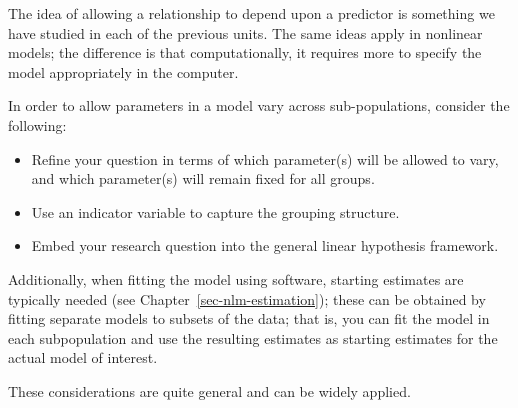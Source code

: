 \documentclass[
  letterpaper,
  DIV=11,
  numbers=noendperiod]{scrreprt}
\providecommand{\tightlist}{%
  \setlength{\itemsep}{0pt}\setlength{\parskip}{0pt}}\usepackage{longtable,booktabs,array}
\theoremstyle{definition}
\theoremstyle{definition}
\theoremstyle{remark}
\begin{document}
The idea of allowing a relationship to depend upon a predictor is
something we have studied in each of the previous units. The same ideas
apply in nonlinear models; the difference is that computationally, it
requires more to specify the model appropriately in the computer.

\begin{tcolorbox}[enhanced jigsaw, left=2mm, toprule=.15mm, arc=.35mm, breakable, opacitybacktitle=0.6, opacityback=0, rightrule=.15mm, colbacktitle=quarto-callout-note-color!10!white, coltitle=black, leftrule=.75mm, toptitle=1mm, colframe=quarto-callout-note-color-frame, titlerule=0mm, title=\textcolor{quarto-callout-note-color}{\faInfo}\hspace{0.5em}{General Approach for Including Interactions}, bottomrule=.15mm, colback=white, bottomtitle=1mm]

In order to allow parameters in a model vary across sub-populations,
consider the following:

\begin{itemize}
\tightlist
\item
  Refine your question in terms of which parameter(s) will be allowed to
  vary, and which parameter(s) will remain fixed for all groups.
\item
  Use an indicator variable to capture the grouping structure.
\item
  Embed your research question into the general linear hypothesis
  framework.
\end{itemize}

Additionally, when fitting the model using software, starting estimates
are typically needed (see Chapter~\ref{sec-nlm-estimation}); these can
be obtained by fitting separate models to subsets of the data; that is,
you can fit the model in each subpopulation and use the resulting
estimates as starting estimates for the actual model of interest.

These considerations are quite general and can be widely applied.

\end{tcolorbox}
\end{document}
